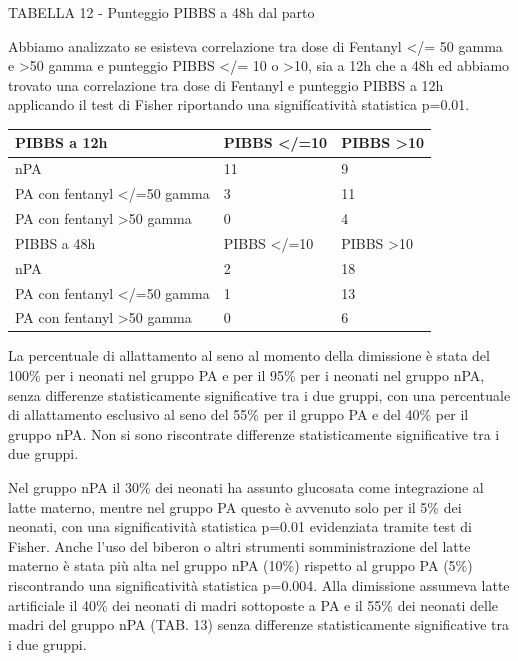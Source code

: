 \documentclass[]{article}
\begin{document}
TABELLA 12 - Punteggio PIBBS a 48h dal parto

Abbiamo analizzato se esisteva correlazione tra dose di Fentanyl
\textless{}/= 50 gamma e \textgreater{}50 gamma e punteggio PIBBS
\textless{}/= 10 o \textgreater{}10, sia a 12h che a 48h ed abbiamo
trovato una correlazione tra dose di Fentanyl e punteggio PIBBS a 12h
applicando il test di Fisher riportando una signifícatività statistica
p=0.01.

\begin{longtable}[]{@{}lll@{}}
\toprule
PIBBS a 12h & PIBBS \textless{}/=10 & PIBBS
\textgreater{}10\tabularnewline
\midrule
\endhead
nPA & 11 & 9\tabularnewline
PA con fentanyl \textless{}/=50 gamma & 3 & 11\tabularnewline
PA con fentanyl \textgreater{}50 gamma & 0 & 4\tabularnewline
PIBBS a 48h & PIBBS \textless{}/=10 & PIBBS
\textgreater{}10\tabularnewline
nPA & 2 & 18\tabularnewline
PA con fentanyl \textless{}/=50 gamma & 1 & 13\tabularnewline
PA con fentanyl \textgreater{}50 gamma & 0 & 6\tabularnewline
\bottomrule
\end{longtable}

La percentuale di allattamento al seno al momento della dimissione è
stata del 100\% per i neonati nel gruppo PA e per il 95\% per i neonati
nel gruppo nPA, senza differenze statisticamente significative tra i due
gruppi, con una percentuale di allattamento esclusivo al seno del 55\%
per il gruppo PA e del 40\% per il gruppo nPA. Non si sono riscontrate
differenze statisticamente significative tra i due gruppi.

Nel gruppo nPA il 30\% dei neonati ha assunto glucosata come
integrazione al latte materno, mentre nel gruppo PA questo è avvenuto
solo per il 5\% dei neonati, con una significatività statistica p=0.01
evidenziata tramite test di Fisher. Anche l'uso del biberon o altri
strumenti somministrazione del latte materno è stata più alta nel gruppo
nPA (10\%) rispetto al gruppo PA (5\%) riscontrando una significatività
statistica p=0.004. Alla dimissione assumeva latte artificiale il 40\%
dei neonati di madri sottoposte a PA e il 55\% dei neonati delle madri
del gruppo nPA (TAB. 13) senza differenze statisticamente significative
tra i due gruppi.
\end{document}
